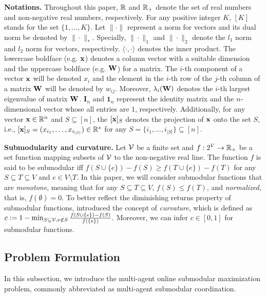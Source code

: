 \textbf{Notations.} Throughout this paper, $\mathbb{R}$ and $\mathbb{R}_{+}$  denote the set of real numbers and non-negative real numbers, respectively. For any positive integer $K$, $[K]$ stands for the set $\{1,\dots, K\}$. Let $\|\cdot\|$ represent a norm for vectors and its dual norm be denoted by $\|\cdot\|_{*}$. Specially, $\|\cdot\|_{1}$ and $\|\cdot\|_{2}$ denote the $l_{1}$ norm and $l_{2}$  norm for vectors, respectively.  $\langle\cdot,\cdot\rangle$ denotes the inner product. The lowercase boldface (e.g. $\mathbf{x}$) denotes a column vector with a suitable dimension and the uppercase boldface (e.g. $\mathbf{W}$) for a matrix. The $i$-th component of a vector $\mathbf{x}$ will be denoted $x_{i}$ and the element in the $i$-th row of the $j$-th column of a matrix $\mathbf{W}$ will be denoted by $w_{ij}$. Moreover, $\lambda_{i}(\mathbf{W})$ denotes the $i$-th largest eigenvalue of matrix $\mathbf{W}$. $\mathbf{I}_{n}$ and $\mathbf{1}_{n}$ represent the identity matrix and the $n$-dimensional vector whose all entries are $1$, respectively. Additionally, for any vector $\mathbf{x}\in\mathbb{R}^{n}$ and $S\subseteq[n]$, the $[\mathbf{x}]_{S}$ denotes the projection of $\mathbf{x}$ onto the set $S$, i.e., $[\mathbf{x}]_{S}=(x_{i_1},\dots,x_{i_{|S|}})\in\mathbb{R}^{s}$ for any $S=\{i_{1},\dots,i_{|S|}\}\subseteq[n]$.
	
	\textbf{Submodularity and curvature.} Let $\mathcal{V}$ be a finite set and $f:2^{V}\rightarrow\mathbb{R}_{+}$ be a set function mapping subsets of $\mathcal{V}$ to the non-negative real line.  The function $f$ is said to be submodular iff $f(S\cup\{e\})-f(S)\ge f(T\cup\{e\})-f(T)$ for any $S\subseteq T\subseteq V$ and $e\in V\setminus T$. In this paper, we will consider submodular functions that are \emph{monotone}, meaning that for any $S\subseteq T\subseteq V$, $f(S)\le f(T)$, and \emph{normalized}, that is, $f(\emptyset)=0$. To better reflect the diminishing returns property of submodular functions, \citet{conforti1984submodular} introduced the concept of \emph{curvature}, which is defined as $c:=1-\min_{S\subseteq\mathcal{V}, e\notin S}\frac{f(S\cup\{e\})-f(S)}{f(\{e\})}$. Moreover, we can infer  $c\in[0,1]$ for submodular functions. 
	\vspace{-0.1em}
\subsection{Problem Formulation}\label{sec:Problem_Formulation}
In this subsection, we introduce the multi-agent online submodular maximization problem, commonly abbreviated as multi-agent submodular coordination.

